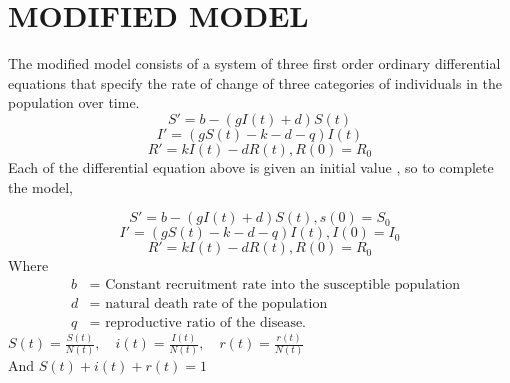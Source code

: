 \documentclass[12pt]{report}
\newcommand{\spn}[1]{\\[#1cm]}
\newcommand{\dsp}{\displaystyle}
\begin{document}
	\section{MODIFIED MODEL}
	The modified model consists of a system of three first order ordinary differential equations that specify the rate of change of three categories of individuals in the population over time.
	\begin{equation}
		S' = b - (gI(t) + d)S(t) \tag{1.1}
	\end{equation}
   \begin{equation}
   	I' = (gS(t) - k - d - q)I(t) \tag{1.2}
   \end{equation}
	\begin{equation}
		R' = kI(t) - dR(t), R(0) = R_0 \tag{1.3}
	\end{equation}
	Each of the differential equation above is given an initial value , so to complete the model,
   
   \begin{equation}
   	S' = b - (gI(t) + d)S(t), s(0)=S_0 \tag{1.4}
   \end{equation}
    \begin{equation}
  	I' = (gS(t) - k - d - q)I(t), I(0)=I_0 \tag{1.5} \label{eq:1_5}
  \end{equation}
  	\begin{equation}
  	R' = kI(t) - dR(t), R(0) = R_0 \tag{1.6}
  \end{equation}
	Where
	\begin{eqnarray*}
	      &b&=\text{ Constant recruitment rate into the susceptible population}\\
	      &d&=\text{ natural death rate of the population}\\ 
	      &q&=\text{ reproductive ratio of the disease.}
    \end{eqnarray*} 
       $\dsp S(t)= \frac {S(t)}{N(t)} ,\quad i(t)=\frac{I(t)}{N(t)},\quad r(t)=\frac{r(t)}{N(t)}$\spn{0.6}
 	And $\dsp S(t) + i(t) + r(t)=1$
 
\end{document}
